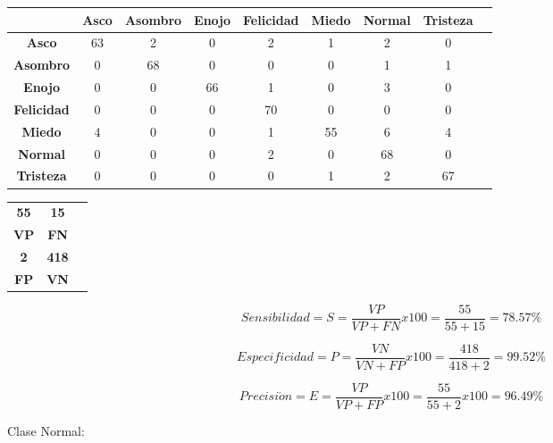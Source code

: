 \begin{table}[ht!]
\centering
\begin{tabular}{|c|c|c|c|c|c|c|c|c|} \hline
 & \bf Asco & \bf Asombro & \bf Enojo & \bf Felicidad & \bf Miedo & \bf Normal & \bf Tristeza \\ \hline
\bf Asco & 63 & 2 & 0 & 2 & 1 & 2 & 0 \\ \hline
\bf Asombro & 0 & 68 & 0 & 0 & 0 & 1 & 1 \\ \hline
\bf Enojo & 0 & 0 & 66 & 1 & 0 & 3 & 0 \\ \hline
\bf Felicidad & 0 & 0 & 0 & 70 & 0 & 0 & 0 \\ \hline
\bf Miedo & 4 & 0 & 0 & 1 & 55 & 6 & 4 \\ \hline
\bf Normal & 0 & 0 & 0 & 2 & 0 & 68 & 0 \\ \hline
\bf Tristeza & 0 & 0 & 0 & 0 & 1 & 2 & 67 \\ \hline

\end{tabular}
\end{table}

\begin{table}[ht!]
\centering
\begin{tabular}{|c|c|c|} \hline
\bf 55 \par & \bf 15 \par \\
\bf VP & \bf FN \\ \hline
\bf 2 \par & \bf 418 \par \\ 
\bf FP & \bf VN \\ \hline 
\end{tabular}
\end{table}

\begin{equation}
Sensibilidad=S=\frac{VP}{VP+FN}x100=\frac{55}{55+15}=78.57\%
\end{equation}

\begin{equation}
Especificidad=P=\frac{VN}{VN+FP}x100=\frac{418}{418+2}=99.52\%
\end{equation}

\begin{equation}
Precisi\acute{o}n=E=\frac{VP}{VP+FP}x100=\frac{55}{55+2}x100=96.49\%
\end{equation}

\vskip 5cm

Clase Normal:

